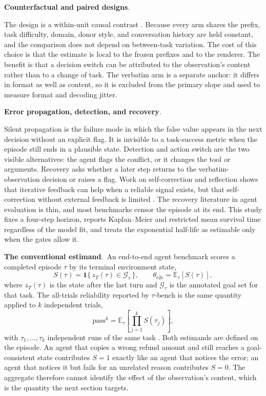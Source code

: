 \documentclass[a4paper,fleqn]{cas-sc}
\begin{document}
\noindent\textbf{Counterfactual and paired designs}.\

The design is a within-unit causal contrast \cite{causal,rubin1974}. Because every arm shares the prefix,
task difficulty, domain, donor style, and conversation history are held constant, and the
comparison does not depend on between-task variation. The cost of this choice is that the
estimate is local to the frozen prefixes and to the renderer. The benefit is that a decision
switch can be attributed to the observation's content rather than to a change of task. The
verbatim arm is a separate anchor: it differs in format as well as content, so it is excluded
from the primary slope and used to measure format and decoding jitter.

\noindent\textbf{Error propagation, detection, and recovery}.\

Silent propagation is the failure mode in which the false value appears in the next decision
without an explicit flag. It is invisible to a task-success metric when the episode still ends
in a plausible state. Detection and action switch are the two visible alternatives: the agent
flags the conflict, or it changes the tool or arguments. Recovery asks whether a later step
returns to the verbatim-observation decision or raises a flag. Work on self-correction and
reflection shows that iterative feedback can help when a reliable signal exists, but that
self-correction without external feedback is limited
\cite{selfrefine,reflexion,critic,selfcorrect_limit}. The recovery literature in agent
evaluation is thin, and most benchmarks censor the episode at its end. This study fixes a
four-step horizon, reports Kaplan--Meier and restricted mean survival time regardless of the
model fit, and treats the exponential half-life as estimable only when the gates allow it.

\noindent\textbf{The conventional estimand}.\
An end-to-end agent benchmark scores a completed episode $\tau$ by its terminal environment state,
\begin{equation}
  S(\tau)=\mathbf{1}\{\,z_T(\tau)\in\mathcal{G}_\tau\,\},
  \qquad
  \theta_{\mathrm{e2e}}=\mathbb{E}_{\tau}\!\left[S(\tau)\right],
  \label{eq:e2e}
\end{equation}
where $z_T(\tau)$ is the state after the last turn and $\mathcal{G}_\tau$ is the annotated goal
set for that task. The all-trials reliability reported by $\tau$-bench is the same quantity
applied to $k$ independent trials,
\begin{equation}
  \mathrm{pass}^{k}=\mathbb{E}_{\tau}\!\left[\prod_{j=1}^{k}S(\tau_j)\right],
  \label{eq:passk}
\end{equation}
with $\tau_1,\dots,\tau_k$ independent runs of the same task \cite{taubench}. Both estimands are
defined on the episode. An agent that copies a wrong refund amount and still reaches a
goal-consistent state contributes $S=1$ exactly like an agent that notices the error; an agent
that notices it but fails for an unrelated reason contributes $S=0$. The aggregate therefore
cannot identify the effect of the observation's content, which is the quantity the next section
targets.
\end{document}
